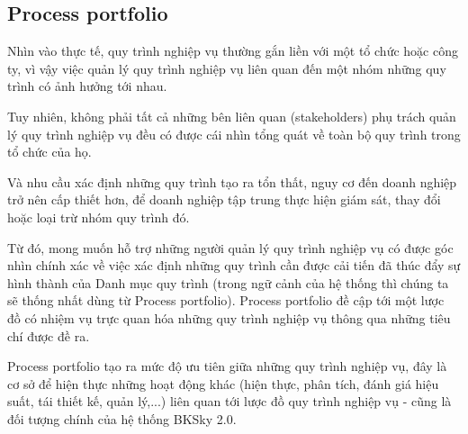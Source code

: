 \subsection{Process portfolio}

Nhìn vào thực tế, quy trình nghiệp vụ thường gắn liền với một tổ chức hoặc công ty, vì vậy việc quản lý quy trình nghiệp vụ liên quan đến một nhóm những quy trình có ảnh hưởng tới nhau. 

Tuy nhiên, không phải tất cả những bên liên quan (stakeholders) phụ trách quản lý quy trình nghiệp vụ đều có được cái nhìn tổng quát về toàn bộ quy trình trong tổ chức của họ.

Và nhu cầu xác định những quy trình tạo ra tổn thất, nguy cơ đến doanh nghiệp trở nên cấp thiết hơn, để doanh nghiệp tập trung thực hiện giám sát, thay đổi hoặc loại trừ nhóm quy trình đó.

Từ đó, mong muốn hỗ trợ những người quản lý quy trình nghiệp vụ có được góc nhìn chính xác về việc xác định những quy trình cần được cải tiến đã thúc đẩy sự hình thành của Danh mục quy trình (trong ngữ cảnh của hệ thống thì chúng ta sẽ thống nhất dùng từ Process portfolio). Process portfolio đề cập tới một lược đồ có nhiệm vụ trực quan hóa những quy trình nghiệp vụ thông qua những tiêu chí được đề ra.

Process portfolio tạo ra mức độ ưu tiên giữa những quy trình nghiệp vụ, đây là cơ sở để hiện thực những hoạt động khác (hiện thực, phân tích, đánh giá hiệu suất, tái thiết kế, quản lý,...) liên quan tới lược đồ quy trình nghiệp vụ - cũng là đối tượng chính của hệ thống BKSky 2.0.